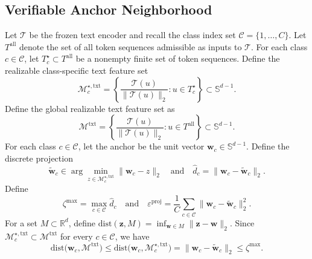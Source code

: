 \documentclass{article}
\theoremstyle{plain}
\theoremstyle{definition}
\theoremstyle{remark}
\begin{document}
	\subsection{Verifiable Anchor Neighborhood}
	Let $\mathcal{T}$ be the frozen text encoder and recall the class index set $\mathcal{C}=\{1,\dots,C\}$.
	Let $T^{\mathrm{all}}$ denote the set of all token sequences admissible as inputs to $\mathcal{T}$.
	For each class $c\in \mathcal{C}$, let $T^\star_c\subset T^{\mathrm{all}}$ be a nonempty finite set of token sequences.
	Define the realizable class-specific text feature set
	\begin{equation*}
		\mathcal{M}^{\star,\mathrm{txt}}_{c}
		=
		\left\{\frac{\mathcal{T}(u)}{\|\mathcal{T}(u)\|_2}:u\in T^\star_c\right\}
		\subset
		\mathbb S^{d-1}.
	\end{equation*}
	Define the global realizable text feature set as
	\begin{equation*}
		\mathcal{M}^{\mathrm{txt}}
		=
		\left\{\frac{\mathcal{T}(u)}{\|\mathcal{T}(u)\|_2}:u\in T^{\mathrm{all}}\right\}
		\subset
		\mathbb S^{d-1}.
	\end{equation*}
	For each class $c\in \mathcal{C}$, let the anchor be the unit vector $\mathbf{w}_{c}\in\mathbb S^{d-1}$.
	Define the discrete projection
	\begin{equation*}
		\tilde{\mathbf{w}}_{c}\in\arg\min_{z\in \mathcal{M}^{\star,\mathrm{txt}}_{c}}\|\mathbf{w}_{c}-z\|_2
		\quad
		\text{and}
		\quad
		\hat d_c=\|\mathbf{w}_{c}-\tilde{\mathbf{w}}_{c}\|_2.
	\end{equation*}
	Define
	\begin{equation*}
		\zeta^{\max}=\max_{c\in \mathcal{C}}\hat d_c
		\quad
		\text{and}
		\quad
		\varepsilon^{\mathrm{proj}}
		=
		\frac{1}{C}\sum_{c\in \mathcal{C}}\|\mathbf{w}_{c}-\tilde{\mathbf{w}}_{c}\|_2^2.
	\end{equation*}
	For a set $M\subset\mathbb R^d$, define $\mathrm{dist}(\mathbf{z},M)=\inf_{\mathbf{w}\in M}\|\mathbf{z}-\mathbf{w}\|_2$.
	Since $\mathcal{M}^{\star,\mathrm{txt}}_{c}\subset \mathcal{M}^{\mathrm{txt}}$ for every $c\in \mathcal{C}$, we have
	\begin{equation*}
		\mathrm{dist}\bigl(\mathbf{w}_{c},\mathcal{M}^{\mathrm{txt}}\bigr)
		\le
		\mathrm{dist}\bigl(\mathbf{w}_{c},\mathcal{M}^{\star,\mathrm{txt}}_{c}\bigr)
		=
		\|\mathbf{w}_{c}-\tilde{\mathbf{w}}_{c}\|_2
		\le
		\zeta^{\max}.
	\end{equation*}
\end{document}
